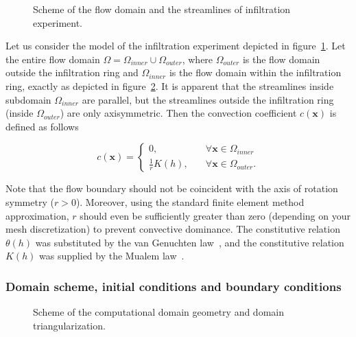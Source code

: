\documentclass[review]{myarticle}
\newenvironment{lineq}
    {\begin{linenomath*}
    \begin{equation}
    }
    { 
    \end{equation} 
    \end{linenomath*}
    }
\renewcommand{\vec}{\mathbf}
\begin{document}
 \begin{figure}
\centering
{}
 \caption{Scheme of the flow domain and the streamlines of infiltration experiment. }
 \label{valecproudy}
\end{figure}

Let us consider the model of the infiltration experiment depicted in figure~\ref{valecproudy}. Let the entire flow domain $\Omega=\Omega_{inner} \cup \Omega_{outer}$, where $\Omega_{outer}$ is the flow domain outside the infiltration ring and $\Omega_{inner}$ is the flow domain within the infiltration ring, exactly as depicted in figure~\ref{valec}. It is apparent that the streamlines inside subdomain $\Omega_{inner}$ are parallel, but the streamlines outside the infiltration ring (inside $\Omega_{outer}$) are only axisymmetric.  Then the convection coefficient $c(\vec{x})$ is defined as follows
\begin{lineq}
\label{convect}
c(\vec{x}) = \begin{cases}
	     0 , \quad &\forall \vec{x} \in \Omega_{inner} \\
	     \frac{1}{r}K(h) , \quad &\forall \vec{x} \in \Omega_{outer}.
	    \end{cases}
\end{lineq}
Note that  the flow boundary should not be coincident with the axis of rotation symmetry ($r>0$). Moreover, using the standard finite element method approximation, $r$ should even be sufficiently greater than zero (depending on your mesh discretization) to prevent convective dominance. The constitutive relation $\theta(h)$ was substituted by the van Genuchten law~\citep{vangenuchten}, and the constitutive relation $K(h)$ was supplied by the Mualem law~\citep{mualem}.





\subsubsection{Domain scheme, initial conditions and boundary conditions}%
\label{bccond}
 \begin{figure}
\centering
{}
 \caption{Scheme of the computational domain geometry and domain triangularization.}
 \label{valec}
\end{figure}
\end{document}
